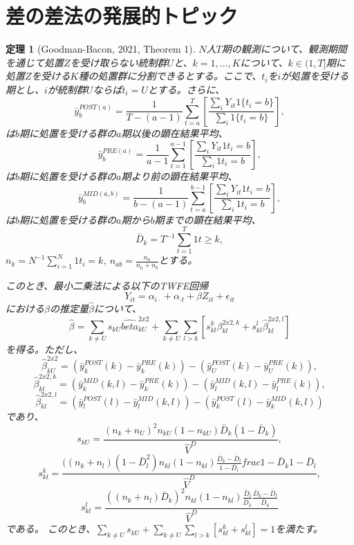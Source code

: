 \documentclass[a4paper]{bxjsarticle}
\newtheorem{theo}{定理}
\begin{document}
\section{差の差法の発展的トピック}
\begin{theo}[Goodman-Bacon, 2021, Theorem 1]
 $N$人$T$期の観測について、観測期間を通じて処置$Z$を受け取らない統制群$U$と、$k = 1,\ldots, K$について、$k \in (1,T]$期に処置$Z$を受ける$K$種の処置群に分割できるとする。ここで、$t_i$を$i$が処置を受ける期とし、$i$が統制群$U$ならば$t_i=U$とする。さらに、
 \[
 \bar{y}^{POST(a)}_b = \frac{1}{T - (a-1)} \sum_{t=a}^T \left[\frac{\sum_{i} Y_{it}1\{t_i = b\}}{\sum_i 1\{t_i = b\}} \right],
 \]
 は$b$期に処置を受ける群の$a$期以後の顕在結果平均、
 \[
 \bar{y}^{PRE(a)}_b = \frac{1}{a-1} \sum_{t=1}^{a-1} \left[\frac{\sum_{i} Y_{it}1{t_i = b}}{\sum_i 1{t_i = b}} \right],
 \]
 は$b$期に処置を受ける群の$a$期より前の顕在結果平均、
 \[
 \bar{y}^{MID(a,b)}_b = \frac{1}{b-(a-1)} \sum_{t=a}^{b-1} \left[\frac{\sum_{i} Y_{it}1{t_i = b}}{\sum_i 1{t_i = b}} \right],
 \]
 は$b$期に処置を受ける群の$a$期から$b$期までの顕在結果平均、
 \[
  \bar{D}_k = T^{-1} \sum_{t=1}^T 1{t \geq k},
 \]
 $n_{k} = N^{-1}\sum_{i=1}^N 1{t_i = k}$, $n_{ab} = \frac{n_a}{n_a + n_b}$とする。
 
 このとき、最小二乗法による以下のTWFE回帰
 \[
   Y_{it} = \alpha_{i\cdot} + \alpha_{\cdot t} + \beta Z_{it} + \epsilon_{it}
 \]
 における$\beta$の推定量$\hat{\beta}$について、
 \[
  \hat{\beta} = \sum_{k \neq U} s_{kU} \hat{beta}_{kU}^{2x2} + \sum_{k \neq U} \sum_{l > k} [s_{kl}^k \beta_{kl}^{2x2,k} + s_{kl}^l \hat{\beta}_{kl}^{2x2,l}]
 \]
 を得る。ただし、
 \[
  \hat{\beta}_{kU}^{2x2} = (\bar{y}_k^{POST}(k) - \bar{y}_k^{PRE}(k)) - (\bar{y}_{U}^{POST}(k) - \bar{y}_{U}^{PRE}(k)),
 \]
 \[
  \hat{\beta}_{kl}^{2x2,k} = (\bar{y}_k^{MID}(k,l) - \bar{y}_k^{PRE}(k)) - (\bar{y}_{l}^{MID}(k,l) - \bar{y}_{l}^{PRE}(k)),
 \]
 \[
  \hat{\beta}_{kl}^{2x2,l} = (\bar{y}_l^{POST}(l) - \bar{y}_l^{MID}(k,l)) - (\bar{y}_{k}^{POST}(l) - \bar{y}_{k}^{MID}(k,l))
 \]
 であり、
 \[
  s_{kU} = \frac{(n_k + n_U)^2 n_{kU}(1 - n_{kU})\bar{D}_k (1 - \bar{D}_k)}{\hat{V}^D},
 \]
 \[
  s_{kl}^k = \frac{((n_k + n_l) (1 - \bar{D}_l^2) n_{kl} (1 - n_{kl}) \frac{\bar{D}_k - \bar{D}_l}{1 - \bar{D}_l}frac{1 - \bar{D}_k}{1 - \bar{D}_l}}{\hat{V}^D},
 \]
 \[
  s_{kl}^l = \frac{((n_k + n_l) \bar{D}_k)^2 n_{kl} (1 - n_{kl}) \frac{\bar{D}_l}{\bar{D}_k} \frac{\bar{D}_k - \bar{D}_l}{\bar{D}_k}}{\hat{V}^D}
 \]
 である。 このとき、$\sum_{k \neq U} s_{kU} + \sum_{k \neq U} \sum_{l > k} [s_{kl}^k + s_{kl}^l] = 1$を満たす。 
\end{theo}
\end{document}
